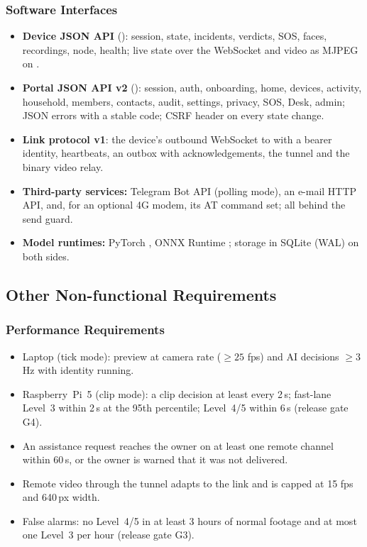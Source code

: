 \subsubsection{Software Interfaces}
\begin{itemize}
\item \textbf{Device JSON API} (): session, state, incidents, verdicts, SOS, faces, recordings, node, health; live state over the  WebSocket and video as MJPEG on .
\item \textbf{Portal JSON API v2} (): session, auth, onboarding, home, devices, activity, household, members, contacts, audit, settings, privacy, SOS, Desk, admin; JSON errors with a stable code; CSRF header on every state change.
\item \textbf{Link protocol v1}: the device's outbound WebSocket to  with a bearer identity, heartbeats, an outbox with acknowledgements, the tunnel and the binary video relay.
\item \textbf{Third-party services:} Telegram Bot API \cite{telegrambotapi} (polling mode), an e-mail HTTP API, and, for an optional 4G modem, its AT command set; all behind the send guard.
\item \textbf{Model runtimes:} PyTorch \cite{paszke2019pytorch}, ONNX Runtime \cite{onnxruntime}; storage in SQLite (WAL) on both sides.
\end{itemize}

\subsection{Other Non-functional Requirements}
\label{sec:nfr}
\subsubsection{Performance Requirements}
\begin{itemize}
\item Laptop (tick mode): preview at camera rate ($\geq 25$ fps) and AI decisions $\geq 3$\,Hz with identity running.
\item Raspberry~Pi~5 (clip mode): a clip decision at least every 2\,s; fast-lane Level~3 within 2\,s at the 95th percentile; Level~4/5 within 6\,s (release gate G4).
\item An assistance request reaches the owner on at least one remote channel within 60\,s, or the owner is warned that it was not delivered.
\item Remote video through the tunnel adapts to the link and is capped at 15 fps and 640\,px width.
\item False alarms: no Level~4/5 in at least 3 hours of normal footage and at most one Level~3 per hour (release gate G3).
\end{itemize}

